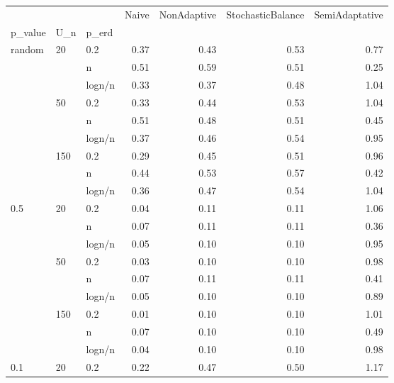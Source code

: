 \begin{tabular}{lllrrrr}
\toprule
     &     &        &  Naive &  NonAdaptive &  StochasticBalance &  SemiAdaptative \\
p\_value & U\_n & p\_erd &        &              &                    &                 \\
\midrule
random & 20  & 0.2 &   0.37 &         0.43 &               0.53 &            0.77 \\
     &     & n &   0.51 &         0.59 &               0.51 &            0.25 \\
     &     & logn/n &   0.33 &         0.37 &               0.48 &            1.04 \\
     & 50  & 0.2 &   0.33 &         0.44 &               0.53 &            1.04 \\
     &     & n &   0.51 &         0.48 &               0.51 &            0.45 \\
     &     & logn/n &   0.37 &         0.46 &               0.54 &            0.95 \\
     & 150 & 0.2 &   0.29 &         0.45 &               0.51 &            0.96 \\
     &     & n &   0.44 &         0.53 &               0.57 &            0.42 \\
     &     & logn/n &   0.36 &         0.47 &               0.54 &            1.04 \\
0.5 & 20  & 0.2 &   0.04 &         0.11 &               0.11 &            1.06 \\
     &     & n &   0.07 &         0.11 &               0.11 &            0.36 \\
     &     & logn/n &   0.05 &         0.10 &               0.10 &            0.95 \\
     & 50  & 0.2 &   0.03 &         0.10 &               0.10 &            0.98 \\
     &     & n &   0.07 &         0.11 &               0.11 &            0.41 \\
     &     & logn/n &   0.05 &         0.10 &               0.10 &            0.89 \\
     & 150 & 0.2 &   0.01 &         0.10 &               0.10 &            1.01 \\
     &     & n &   0.07 &         0.10 &               0.10 &            0.49 \\
     &     & logn/n &   0.04 &         0.10 &               0.10 &            0.98 \\
0.1 & 20  & 0.2 &   0.22 &         0.47 &               0.50 &            1.17 \\

\end{tabular}
